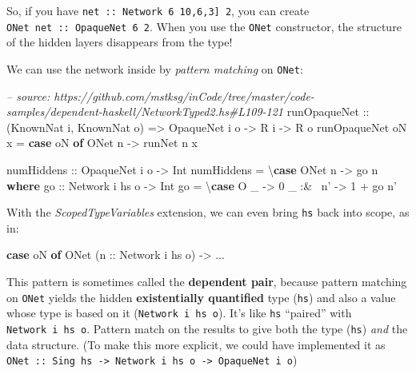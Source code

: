\documentclass[]{article}
\newenvironment{Shaded}{}{}
\newcommand{\KeywordTok}[1]{\textcolor[rgb]{0.00,0.44,0.13}{\textbf{{#1}}}}
\newcommand{\DataTypeTok}[1]{\textcolor[rgb]{0.56,0.13,0.00}{{#1}}}
\newcommand{\DecValTok}[1]{\textcolor[rgb]{0.25,0.63,0.44}{{#1}}}
\newcommand{\CommentTok}[1]{\textcolor[rgb]{0.38,0.63,0.69}{\textit{{#1}}}}
\newcommand{\OtherTok}[1]{\textcolor[rgb]{0.00,0.44,0.13}{{#1}}}
\newcommand{\FunctionTok}[1]{\textcolor[rgb]{0.02,0.16,0.49}{{#1}}}
\newcommand{\NormalTok}[1]{{#1}}
\begin{document}
So, if you have \texttt{net\ ::\ Network\ 6\ \textquotesingle{}{[}10,6,3{]}\ 2},
you can create \texttt{ONet\ net\ ::\ OpaqueNet\ 6\ 2}. When you use the
\texttt{ONet} constructor, the structure of the hidden layers disappears from
the type!

We can use the network inside by \emph{pattern matching} on \texttt{ONet}:

\begin{Shaded}
\begin{Highlighting}[]
\CommentTok{-- source: https://github.com/mstksg/inCode/tree/master/code-samples/dependent-haskell/NetworkTyped2.hs#L109-121}
\OtherTok{runOpaqueNet ::} \NormalTok{(}\DataTypeTok{KnownNat} \NormalTok{i, }\DataTypeTok{KnownNat} \NormalTok{o)}
             \OtherTok{=>} \DataTypeTok{OpaqueNet} \NormalTok{i o}
             \OtherTok{->} \DataTypeTok{R} \NormalTok{i}
             \OtherTok{->} \DataTypeTok{R} \NormalTok{o}
\NormalTok{runOpaqueNet oN x }\FunctionTok{=} \KeywordTok{case} \NormalTok{oN }\KeywordTok{of}
                      \DataTypeTok{ONet} \NormalTok{n }\OtherTok{->} \NormalTok{runNet n x}

\OtherTok{numHiddens ::} \DataTypeTok{OpaqueNet} \NormalTok{i o }\OtherTok{->} \DataTypeTok{Int}
\NormalTok{numHiddens }\FunctionTok{=} \NormalTok{\textbackslash{}}\KeywordTok{case} \DataTypeTok{ONet} \NormalTok{n }\OtherTok{->} \NormalTok{go n}
  \KeywordTok{where}
\OtherTok{    go ::} \DataTypeTok{Network} \NormalTok{i hs o }\OtherTok{->} \DataTypeTok{Int}
    \NormalTok{go }\FunctionTok{=} \NormalTok{\textbackslash{}}\KeywordTok{case} \DataTypeTok{O} \NormalTok{_      }\OtherTok{->} \DecValTok{0}
               \NormalTok{_ }\FunctionTok{:&~} \NormalTok{n' }\OtherTok{->} \DecValTok{1} \FunctionTok{+} \NormalTok{go n'}
\end{Highlighting}
\end{Shaded}

With the \emph{ScopedTypeVariables} extension, we can even bring \texttt{hs}
back into scope, as in:

\begin{Shaded}
\begin{Highlighting}[]
\KeywordTok{case} \NormalTok{oN }\KeywordTok{of}
  \DataTypeTok{ONet} \NormalTok{(}\OtherTok{n ::} \DataTypeTok{Network} \NormalTok{i hs o) }\OtherTok{->} \FunctionTok{...}
\end{Highlighting}
\end{Shaded}

This pattern is sometimes called the \textbf{dependent pair}, because pattern
matching on \texttt{ONet} yields the hidden \textbf{existentially quantified}
type (\texttt{hs}) and also a value whose type is based on it
(\texttt{Network\ i\ hs\ o}). It's like \texttt{hs} ``paired'' with
\texttt{Network\ i\ hs\ o}. Pattern match on the results to give both the type
(\texttt{hs}) \emph{and} the data structure. (To make this more explicit, we
could have implemented it as
\texttt{ONet\ ::\ Sing\ hs\ -\textgreater{}\ Network\ i\ hs\ o\ -\textgreater{}\ OpaqueNet\ i\ o})
\end{document}
